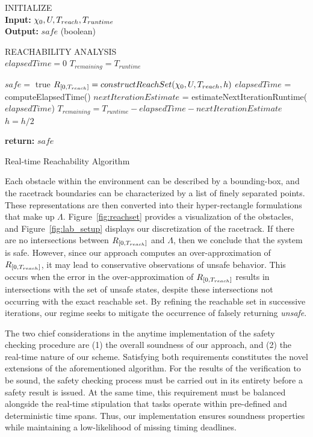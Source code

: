 \documentclass[manuscript,screen,review]{acmart}
\newcommand{\figref}[1]{Figure~\ref{#1}}
\begin{document}
\begin{algorithm}[htbp]%
\DontPrintSemicolon 
INITIALIZE{
\\
\textbf{Input:} $\chi_0,\mathnormal{U},T_{reach}, T_{runtime}$ \\
\textbf{Output:} $safe$ (boolean)
}

\vspace{2mm}

REACHABILITY ANALYSIS\\
$elapsedTime = 0$\;
$T_{remaining} = T_{runtime}$\;
 {
    $safe = $ true\;
    $\mathnormal{R}_{[0,T_{reach}]}= constructReachSet(\chi_0,\mathnormal{U},T_{reach},h)$\;
    $elapsedTime$ = computeElapsedTime()\;
    $nextIterationEstimate$ = estimateNextIterationRuntime($elapsedTime$)\;
    $T_{remaining} = T_{runtime} -elapsedTime - nextIterationEstimate$\;
    $h = h /2$\;
    
    
    
}
\textbf{return:} $safe$
\caption{Real-time Reachability Algorithm}
\label{alg:algo_rtreach}
\end{algorithm}%

Each obstacle within the environment can be described by a bounding-box, and the racetrack boundaries can be characterized by a list of finely separated points. These representations are then converted into their hyper-rectangle formulations that make up $\Lambda$. \figref{fig:reachset} provides a visualization of the obstacles, and \figref{fig:lab_setup} displays our discretization of the racetrack. If there are no intersections between $\mathnormal{R}_{[0,T_{reach}]}$ and $\Lambda$, then we conclude that the system is safe. However, since our approach computes an  over-approximation of $\mathnormal{R}_{[0,T_{reach}]}$, it may lead to conservative observations of unsafe behavior. This occurs when the error in the over-approximation of $\mathnormal{R}_{[0,T_{reach}]}$ results in intersections with the set of unsafe states, despite these intersections not occurring with the exact reachable set. By refining the reachable set in successive iterations, our regime seeks to mitigate the occurrence of falsely returning \emph{unsafe}.%


The two chief considerations in the anytime implementation of the safety checking procedure are (1) the overall soundness of our approach, and (2) the real-time nature of our scheme. Satisfying both requirements constitutes the novel extensions of the aforementioned algorithm. For the results of the verification to be sound, the safety checking process must be carried out in its entirety before a safety result is issued. At the same time, this requirement must be balanced alongside the real-time stipulation that tasks operate within pre-defined and deterministic time spans. Thus, our implementation ensures soundness properties while maintaining a low-likelihood of missing timing deadlines. 
\end{document}
